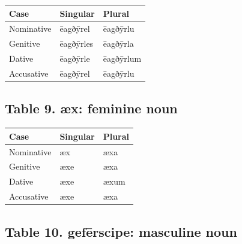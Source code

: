 \par\begingroup
\fontsize{10.5}{13.2}\selectfont
\setlength{\LTleft}{0pt}\setlength{\LTright}{\fill}
\noindent
\begin{tabular}{@{}>{\raggedright\arraybackslash}p{39.46mm}>{\raggedright\arraybackslash}p{39.46mm}>{\raggedright\arraybackslash}p{39.46mm}@{}}
\toprule
\textbf{Case} & \textbf{Singular} & \textbf{Plural} \\
\midrule
Nominative & ēagðȳrel & ēagðȳrlu \\
Genitive & ēagðȳrles & ēagðȳrla \\
Dative & ēagðȳrle & ēagðȳrlum \\
Accusative & ēagðȳrel & ēagðȳrlu \\
\bottomrule
\end{tabular}
\par\endgroup

\subsection*{Table 9. æx: feminine noun}

\par\begingroup
\fontsize{10.5}{13.2}\selectfont
\setlength{\LTleft}{0pt}\setlength{\LTright}{\fill}
\noindent
\begin{tabular}{@{}>{\raggedright\arraybackslash}p{39.46mm}>{\raggedright\arraybackslash}p{39.46mm}>{\raggedright\arraybackslash}p{39.46mm}@{}}
\toprule
\textbf{Case} & \textbf{Singular} & \textbf{Plural} \\
\midrule
Nominative & æx & æxa \\
Genitive & æxe & æxa \\
Dative & æxe & æxum \\
Accusative & æxe & æxa \\
\bottomrule
\end{tabular}
\par\endgroup

\subsection*{Table 10. gefērscipe: masculine noun}

